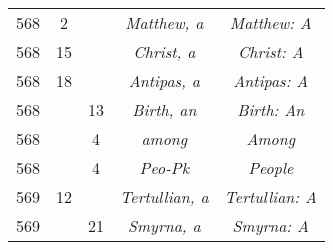\documentclass[a4paper,11pt]{article}
\numberwithin{equation}{section}
\begin{document}
\begin{center}
\begin{tabular}{|c|c|c|c|c|}
    568 & \hphantom{0}2 & & \textit{Matthew, a} & \textit{Matthew: A} \\
    568 & 15 & & \textit{Christ, a} & \textit{Christ: A} \\
    568 & 18 & & \textit{Antipas, a} & \textit{Antipas: A} \\
    568 & & 13 & \textit{Birth, an} & \textit{Birth: An} \\
    568 & & \hphantom{0}4 & \textit{among} & \textit{Among} \\
    568 & & \hphantom{0}4 & \textit{Peo-Pk} & \textit{People} \\
    569 & 12 & & \textit{Tertullian, a} & \textit{Tertullian: A} \\
    569 & & 21 & \textit{Smyrna, a} & \textit{Smyrna: A} \\
    \hline
  \end{tabular}





  \newpage


\end{center}
\end{document}
